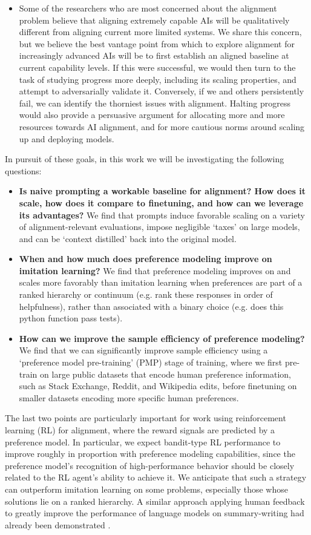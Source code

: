 \begin{itemize}
\item Some of the researchers who are most concerned about the alignment problem believe that aligning extremely capable AIs will be qualitatively different from aligning current more limited systems. We share this concern, but we believe the best vantage point from which to explore alignment for increasingly advanced AIs will be to first establish an aligned baseline at current capability levels.  If this were successful, we would then turn to the task of studying progress more deeply, including its scaling properties, and attempt to adversarially validate it.  Conversely, if we and others persistently fail, we can identify the thorniest issues with alignment.  Halting progress would also provide a persuasive argument for allocating more and more resources towards AI alignment, and for more cautious norms around scaling up and deploying models.
\end{itemize}

In pursuit of these goals, in this work we will be investigating the following questions:

\begin{itemize}
    \item {\bf Is naive prompting a workable baseline for alignment?  How does it scale, how does it compare to finetuning, and how can we leverage its advantages?} We find that prompts induce favorable scaling on a variety of alignment-relevant evaluations, impose negligible `taxes' on large models, and can be `context distilled' back into the original model.
    \item {\bf When and how much does preference modeling improve on imitation learning?}  We find that preference modeling improves on and scales more favorably than imitation learning when preferences are part of a ranked hierarchy or continuum (e.g. rank these responses in order of helpfulness), rather than associated with a binary choice (e.g. does this python function pass tests).
    \item {\bf How can we improve the sample efficiency of preference modeling?}  We find that we can significantly improve sample efficiency using a `preference model pre-training' (PMP) stage of training, where we first pre-train on large public datasets that encode human preference information, such as Stack Exchange, Reddit, and Wikipedia edits, before finetuning on smaller datasets encoding more specific human preferences. 
\end{itemize}

The last two points are particularly important for  work using reinforcement learning (RL) for alignment, where the reward signals are predicted by a preference model. In particular, we expect bandit-type RL performance to improve roughly in proportion with preference modeling capabilities, since the preference model's recognition of high-performance behavior should be closely related to the RL agent's ability to achieve it. We anticipate that such a strategy can outperform imitation learning on some problems, especially those whose solutions lie on a ranked hierarchy. A similar approach applying human feedback to greatly improve the performance of language models on summary-writing had already been demonstrated  \cite{stiennon2020learning}.

